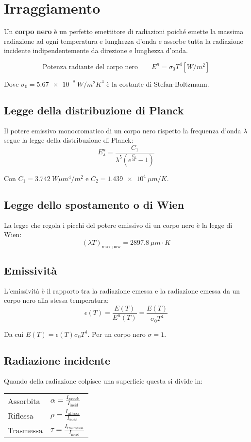 \section{Irraggiamento}

Un \textbf{corpo nero} è un perfetto emettitore di radiazioni poiché emette la massima radiazione ad ogni temperatura e lunghezza d'onda e assorbe tutta la radiazione incidente indipendentemente da direzione e lunghezza d'onda.

\[
    \text{Potenza radiante del corpo nero} \qquad E^n = \sigma_0 T^4 [W/m^2]
\]

Dove $\sigma_0 = \SI{5.67e-8}{W/m^2K^4}$ è la costante di Stefan-Boltzmann.

\subsection{Legge della distribuzione di Planck}
Il potere emissivo monocromatico di un corpo nero rispetto la frequenza d'onda $\lambda$ segue la legge della distribuzione di Planck:
\[
    E^n_\lambda = \frac{C_1}{\lambda^5 (e^{\frac{C_2}{\lambda T}} - 1) }
\]

Con $C_1 = \SI{3.742}{W \mu m^4/m^2}$ e $C_2 = \SI{1.439e4}{\mu m / K}$.

\subsection{Legge dello spostamento o di Wien}
La legge che regola i picchi del potere emissivo di un corpo nero è la legge di Wien:
\[
    (\lambda T)_{\text{max pow}} = \SI{2897.8}{\mu m\cdot K}
\]

\subsection{Emissività}
L'emissività è il rapporto tra la radiazione emessa e la radiazione emessa da un corpo nero alla stessa temperatura:
\[
    \epsilon(T) = \frac{E(T)}{E^n(T)} = \frac{E(T)}{\sigma_0T^4}
\]

Da cui $E(T) = \epsilon(T)\sigma_0T^4$. Per un corpo nero $\sigma = 1$.

\subsection{Radiazione incidente}
Quando della radiazione colpisce una superficie questa si divide in:

\begin{tabular}{ll}
    Assorbita & $\alpha = \frac{I_\text{assorb}}{I_\text{incid}}$ \\
    Riflessa & $\rho = \frac{I_\text{riflessa}}{I_\text{incid}}$ \\
    Trasmessa & $\tau = \frac{I_\text{trasmessa}}{I_\text{incid}}$ \\
\end{tabular}

